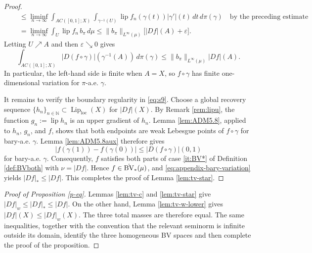 \documentclass[11pt]{amsart}
\theoremstyle{definition}
\theoremstyle{remark}
\numberwithin{equation}{section}
\newcommand{\abs}[1]{|#1|}
\newcommand{\Norm}[2]{\|#1\|_{#2}}
\begin{document}
\begin{proof}
\begin{align*}
 &\quad\leq\liminf_{n\to\infty}
 \int_{AC([0,1];X)}\int_{\gamma^{-1}(U)}
  \operatorname{lip}f_n(\gamma(t))\abs{\gamma'}(t)\,dt\,d\pi(\gamma)
 \quad\text{by the preceding estimate}\\
 &\quad=\liminf_{n\to\infty}\int_U
 \operatorname{lip}f_n\,b_\pi\,d\mu\leq\Norm{b_\pi}{L^\infty(\mu)}
 \bigl[|Df|(A)+\varepsilon\bigr].
\end{align*}
Letting $U\nearrow A$ and then $\varepsilon\searrow 0$ gives
\begin{equation}\label{eq:appendix-bary-variation}
 \int_{AC([0,1];X)}
 |D(f\circ\gamma)|(\gamma^{-1}(A))\,d\pi(\gamma)
 \leq\Norm{b_\pi}{L^\infty(\mu)}|Df|(A).
\end{equation}
In particular, the left-hand side is finite when $A=X$, so
$f\circ\gamma$ has finite one-dimensional variation for $\pi$-a.e.
$\gamma$.

It remains to verify the boundary regularity in \eqref{eq:s9}.
Choose a global recovery sequence
$\{h_n\}_{n\in\mathbb N}\subset\operatorname{Lip}_{\mathrm{loc}}(X)$ for
$|Df|(X)$.  By Remark \ref{rem:lipu}, the function
$g_n:=\operatorname{lip}h_n$ is an upper gradient of $h_n$.  Lemma
\ref{lem:ADM5.8}, applied to $h_n$, $g_n$, and $f$, shows that both
endpoints are weak Lebesgue points of $f\circ\gamma$ for bary-a.e.
$\gamma$.  Lemma \ref{lem:ADM5.8aux} therefore gives
\begin{equation*}
 \abs{f(\gamma(1))-f(\gamma(0))}
 \leq |D(f\circ\gamma)|(0,1)
\end{equation*}
for bary-a.e. $\gamma$.
Consequently, $f$ satisfies both parts of case \eqref{it:BV*} of Definition \ref{def:BVboth}
with $\nu=|Df|$.  Hence $f\in\dot{\rm BV}_*(\mu)$, and
\eqref{eq:appendix-bary-variation} yields $|Df|_*\leq|Df|$.
This completes the proof of Lemma \ref{lem:tv-star}.
\end{proof}

\begin{proof}[Proof of Proposition \ref{p-eq}]
Lemmas \ref{lem:tv-c} and \ref{lem:tv-star} give
$|Df|_w\leq |Df|_*\leq |Df|.$
On the other hand, Lemma \ref{lem:tv-w-lower} gives
$|Df|(X)\leq |Df|_w(X).$
The three total masses are therefore equal.  The same inequalities,
together with the convention that the relevant seminorm is infinite
outside its domain, identify the three homogeneous BV spaces and
then complete the proof of the proposition.
\end{proof}
\end{document}
